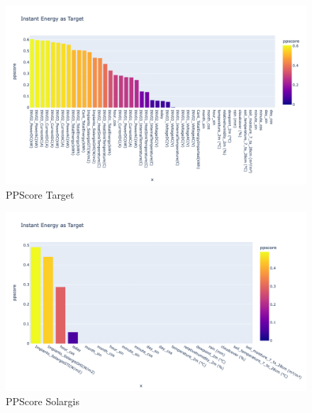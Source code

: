 \begin{figure}[H]
	\centering
	\includegraphics[width=\textwidth, keepaspectratio]{chapters/2_data_preprocessing/imgs/pptarget.png}
	\caption{PPScore Target} %
	\label{fig:ppstarget}
\end{figure}

\begin{figure}[H]
	\centering
	\includegraphics[width=\textwidth, keepaspectratio]{chapters/2_data_preprocessing/imgs/ppbucotarget.png}
	\caption{PPScore Solargis} %
	\label{fig:ppssolargis}
\end{figure}